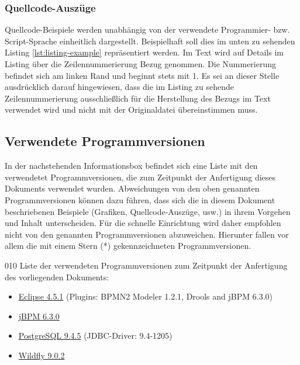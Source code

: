 \subsubsection{Quellcode-Auszüge}
Quellcode-Beispiele werden unabhängig von der verwendete Programmier- bzw. Script-Sprache einheitlich dargestellt. Beispielhaft soll dies im unten zu sehenden Listing \ref{lst:listing-example} repräsentiert werden. 
Im Text wird auf Details im Listing über die Zeilennummerierung Bezug genommen. Die Nummerierung befindet sich am linken Rand und beginnt stets mit 1. Es sei an dieser Stelle ausdrücklich darauf hingewiesen, dass die im Listing zu sehende Zeilennummerierung ausschließlich für die Herstellung des Bezugs im Text verwendet wird und nicht mit der Originaldatei übereinstimmen muss.
\subsection{Verwendete Programmversionen}
In der nachstehenden Informationsbox befindet sich eine Liste mit den verwendetet Programmversionen, die zum Zeitpunkt der Anfertigung dieses Dokuments verwendet wurden. Abweichungen von den oben genannten Programmversionen können dazu führen, dass sich die in diesem Dokument beschriebenen Beispiele (Grafiken, Quellcode-Auszüge, usw.) in ihrem Vorgehen und Inhalt unterscheiden. Für die schnelle Einrichtung wird daher empfohlen nicht von den genannten Programmversionen abzuweichen. Hierunter fallen vor allem die mit einem Stern (*) gekennzeichneten Programmversionen.
\begin{info}{010}
	Liste der verwendeten Programmversionen zum Zeitpunkt der Anfertigung des vorliegenden Dokuments:
	\begin{itemize}
		\item \href{http://www.eclipse.org/downloads/download.php?file=/technology/epp/downloads/release/mars/1/eclipse-jee-mars-1-win32-x86_64.zip}{Eclipse 4.5.1} (Plugins: BPMN2 Modeler 1.2.1, Drools and jBPM 6.3.0)
		\item \href{http://sourceforge.net/projects/jbpm/files/jBPM\%206/jbpm-6.3.0.Final/}{jBPM 6.3.0}\star
		\item \href{http://get.enterprisedb.com/postgresql/postgresql-9.4.5-1-windows-x64.exe}{PostgreSQL 9.4.5} (JDBC-Driver: 9.4-1205)
		\item \href{http://download.jboss.org/wildfly/9.0.2.Final/wildfly-9.0.2.Final.zip}{Wildfly 9.0.2}\star
	\end{itemize}
\end{info}